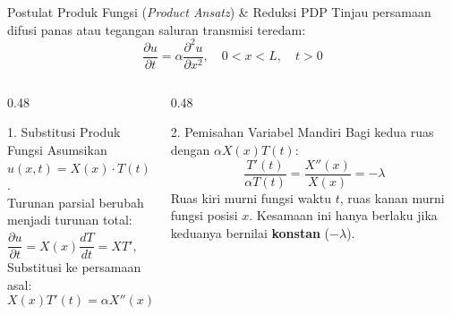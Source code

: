 \documentclass[aspectratio=169,10pt]{beamer}
\begin{document}
\begin{frame}{Postulat Produk Fungsi (\textit{Product Ansatz}) \& Reduksi PDP}
  Tinjau persamaan difusi panas atau tegangan saluran transmisi teredam:
  \begin{equation*}
    \frac{\partial u}{\partial t} = \alpha \frac{\partial^2 u}{\partial x^2}, \quad 0 < x < L, \quad t > 0
  \end{equation*}
  \begin{columns}[t]
    \begin{column}{0.48\textwidth}
      \begin{block}{1. Substitusi Produk Fungsi}
        Asumsikan $u(x, t) = X(x) \cdot T(t)$.\\
        Turunan parsial berubah menjadi turunan total:
        \begin{equation*}
          \frac{\partial u}{\partial t} = X(x) \frac{dT}{dt} = X T', \quad \frac{\partial^2 u}{\partial x^2} = X'' T
        \end{equation*}
        Substitusi ke persamaan asal:
        \begin{equation*}
          X(x) T'(t) = \alpha X''(x) T(t)
        \end{equation*}
      \end{block}
    \end{column}
    \begin{column}{0.48\textwidth}
      \begin{alertblock}{2. Pemisahan Variabel Mandiri}
        Bagi kedua ruas dengan $\alpha X(x) T(t)$:
        \begin{equation*}
          \frac{T'(t)}{\alpha T(t)} = \frac{X''(x)}{X(x)} = -\lambda
        \end{equation*}
        \small
        Ruas kiri murni fungsi waktu $t$, ruas kanan murni fungsi posisi $x$.
        Kesamaan ini hanya berlaku jika keduanya bernilai \textbf{konstan} ($-\lambda$).
      \end{alertblock}
    \end{column}
  \end{columns}
\end{frame}
\end{document}
